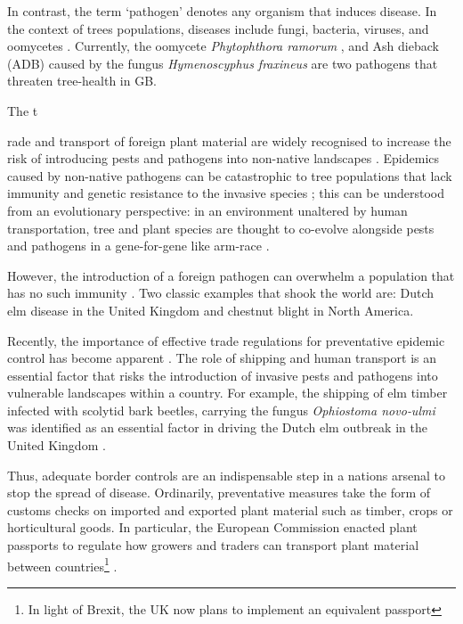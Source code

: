 In contrast, the term `pathogen' denotes any organism that induces disease. 
In the context of trees populations, diseases include fungi, bacteria, viruses, and oomycetes \cite{balloux2017q, Boyd1235773}. 
Currently, the oomycete \textit{Phytophthora ramorum} \cite{brasier2005phytophthora}, and Ash dieback (ADB)
caused by the fungus \textit{Hymenoscyphus fraxineus} \cite{ash-dieback-costs, mitchell2014ash} are two pathogens
that threaten tree-health in GB.


The t\usepackage[]{}rade and transport of foreign plant material are widely recognised to increase the risk
of introducing pests and pathogens into non-native landscapes \cite{POTTER201761, lovett2016nonnative, roy2014increasing}.
Epidemics caused by non-native pathogens can be catastrophic to tree populations that lack immunity and genetic
resistance to the invasive species \cite{doi:10.1002/9781444329988.ch8}; this can be understood from an evolutionary perspective: 
in an environment unaltered by human transportation, tree and plant species are thought to co-evolve alongside pests and pathogens
in a gene-for-gene like arm-race \cite{flor1971current, dangl2001plant, Thrall1735}. 

However, the introduction of a foreign
pathogen can overwhelm a population that has no such immunity \cite{desprez2016evolutionary}. Two classic examples that shook
the world are: Dutch elm disease \cite{doi:10.1111/j.1365-3059.2010.02391.x} in the United Kingdom and chestnut blight
\cite{doi:10.1002/9780470535486.ch7} in North America.

Recently, the importance of effective trade regulations for preventative epidemic control has become apparent
\cite{rodoni2009role}. The role of shipping and human transport is an essential factor that risks the introduction
of invasive pests and pathogens into vulnerable landscapes within a country. For example, the shipping of elm timber
infected with scolytid bark beetles, carrying the fungus \textit{Ophiostoma novo‐ulmi} was identified as an essential
factor in driving the Dutch elm outbreak in the United Kingdom \cite{doi:10.1111/j.1365-3059.2010.02391.x}. 

Thus, adequate border controls are an indispensable step in a nations arsenal to stop the spread of disease.
Ordinarily, preventative measures take the form of customs checks on imported and exported plant material such
as timber, crops or horticultural goods. In particular, the European Commission enacted plant passports to regulate
how growers and traders can transport plant material between countries\footnote{In light of Brexit, the UK now plans
to implement an equivalent passport} \cite{wulfert2010implementation}.


